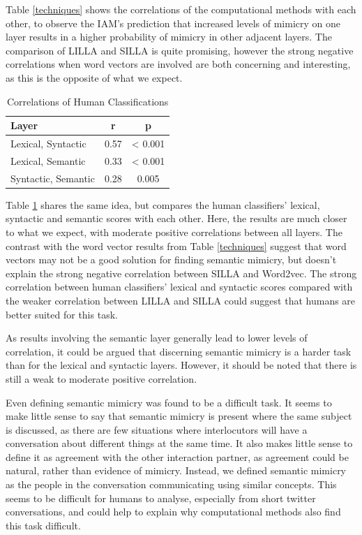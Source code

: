 \documentclass[conference]{IEEEtran}
\begin{document}
Table \ref{techniques} shows the correlations of the computational methods with each other, to observe the IAM's prediction that increased levels of mimicry on one layer results in a higher probability of mimicry in other adjacent layers. The comparison of LILLA and SILLA is quite promising, however the strong negative correlations when word vectors are involved are both concerning and interesting, as this is the opposite of what we expect.

\begin{table}[!t]
\caption{Correlations of Human Classifications}
\label{classifications}
\centering
\renewcommand{\arraystretch}{1.2}
\begin{tabular}{l c c}
Layer & r & p \\
\hline
Lexical, Syntactic & 0.57 & < 0.001 \\
Lexical, Semantic & 0.33 & < 0.001 \\
Syntactic, Semantic & 0.28 & 0.005
\end{tabular}
\end{table}

Table \ref{classifications} shares the same idea, but compares the human classifiers' lexical, syntactic and semantic scores with each other. Here, the results are much closer to what we expect, with moderate positive correlations between all layers. The contrast with the word vector results from Table \ref{techniques} suggest that word vectors may not be a good solution for finding semantic mimicry, but doesn't explain the strong negative correlation between SILLA and Word2vec. The strong correlation between human classifiers' lexical and syntactic scores compared with the weaker correlation between LILLA and SILLA could suggest that humans are better suited for this task.

As results involving the semantic layer generally lead to lower levels of correlation, it could be argued that discerning semantic mimicry is a harder task than for the lexical and syntactic layers. However, it should be noted that there is still a weak to moderate positive correlation.

Even defining semantic mimicry was found to be a difficult task. It seems to make little sense to say that semantic mimicry is present where the same subject is discussed, as there are few situations where interlocutors will have a conversation about different things at the same time. It also makes little sense to define it as agreement with the other interaction partner, as agreement could be natural, rather than evidence of mimicry. Instead, we defined semantic mimicry as the people in the conversation communicating using similar concepts. This seems to be difficult for humans to analyse, especially from short twitter conversations, and could help to explain why computational methods also find this task difficult.
\end{document}

